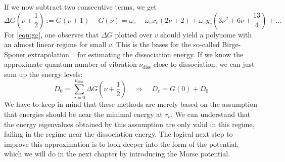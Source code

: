 If we now subtract two consecutive terms, we get
\begin{equation}
    \Delta G\left (\nu +\frac{1}{2} \right ) := G(\nu +1 ) - G(\nu) 
    = \omega_e - \omega_e x_e \left (2\nu +2\right ) + \omega_e y_e 
    \left (3\nu^2+ 6\nu + \frac{13}{4} 
        \right) + \ldots 
    \label{eqn:dG1_2}
\end{equation} 
For \eqref{eqn:gg}, one observes that $\Delta G$ plotted over 
$v$ should yield a polynome with an almost linear regime for 
small $v$. This is the bases for the so-called Birge-Sponer 
extrapolation ~\cite{hollas2002basic} for estimating the dissociation energy. 
If we know the approximate quantum number of vibration $\nu_\mathrm{diss}$ 
close to dissociation, we can just sum up the energy levels:
\begin{equation}
    D_0 = \sum_{\nu = 0 }^{\nu_\mathrm{diss}} \Delta G \left (\nu + \frac{1}{2} \right )
    \quad \Rightarrow \quad D_e = G(0) + D_0
    \label{eqn:D_0}
\end{equation}
We have to keep in mind that these methods are merely based on the
assumption that energies should be near the minimal energy at $r_e$.
We can understand that the energy eigenvalues obtained by this
assumption are only valid in this regime, failing in the regime
near the dissociation energy. The logical next step to improve this 
approximation is to look deeper into the form of the potential,
which we will do in the next chapter by introducing the Morse potential.


